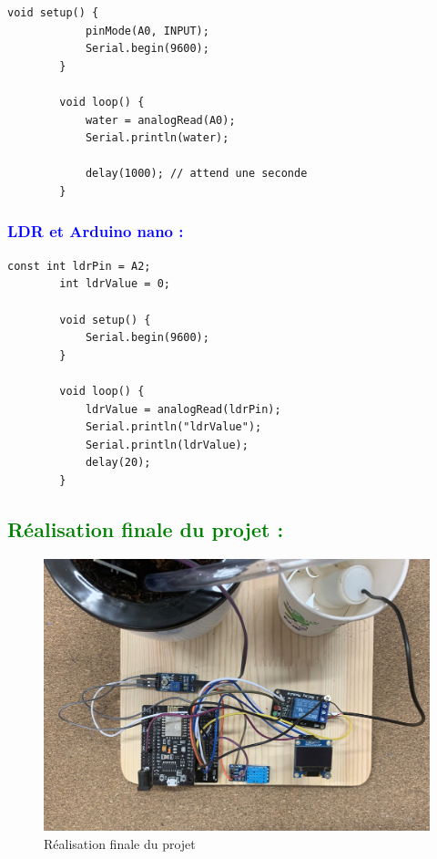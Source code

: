 \begin{flushleft}
\begin{lstlisting}[style=CStyle]
		void setup() {
			pinMode(A0, INPUT);
			Serial.begin(9600); 
		}
		
		void loop() {
			water = analogRead(A0);
			Serial.println(water);
			
			delay(1000); // attend une seconde
		}
	\end{lstlisting}

		\subsubsection{\textcolor{blue}{LDR et Arduino nano :}}
	\begin{lstlisting}[style=CStyle]
		const int ldrPin = A2;
		int ldrValue = 0;
		
		void setup() {
			Serial.begin(9600);
		}
		
		void loop() {
			ldrValue = analogRead(ldrPin);
			Serial.println("ldrValue");
			Serial.println(ldrValue);
			delay(20);
		}
	\end{lstlisting}
		
	\subsection{\textcolor{green}{Réalisation finale du projet :}}
		\begin{figure}[h]
			\centering
			\includegraphics{chapitres/images/Realisation.jpg}
			\caption{Réalisation finale du projet}
			\label{fig:labelname}
		\end{figure}
	\newpage

\end{flushleft}
